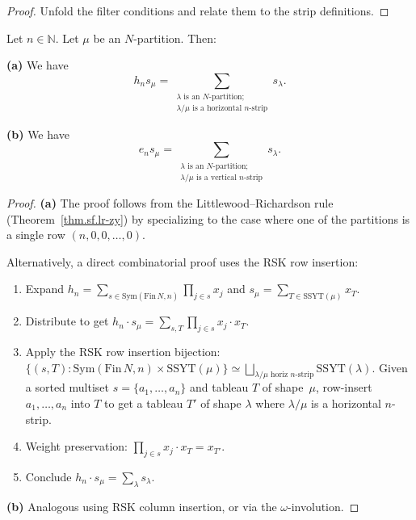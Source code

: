 \begin{proof}
\leanok
Unfold the filter conditions and relate them to the strip definitions.
\end{proof}

\begin{theorem}
\label{thm.sf.pieri}
\leantarget
Let $n\in\mathbb{N}$. Let $\mu$ be an
$N$-partition. Then:

\textbf{(a)} We have%
\[
h_{n}s_{\mu}=\sum_{\substack{\lambda\text{ is an }N\text{-partition;}%
\\\lambda/\mu\text{ is a horizontal }n\text{-strip}}}s_{\lambda}.
\]


\textbf{(b)} We have%
\[
e_{n}s_{\mu}=\sum_{\substack{\lambda\text{ is an }N\text{-partition;}%
\\\lambda/\mu\text{ is a vertical }n\text{-strip}}}s_{\lambda}.
\]
\end{theorem}

\begin{proof}
\textbf{(a)} The proof follows from the Littlewood--Richardson rule
(Theorem~\ref{thm.sf.lr-zy}) by
specializing to the case where one of the partitions is a single row
$(n, 0, 0, \ldots, 0)$.

Alternatively, a direct combinatorial proof uses the RSK row insertion:
\begin{enumerate}
\item Expand $h_n = \sum_{s \in \mathrm{Sym}(\mathrm{Fin}\,N, n)} \prod_{j \in s} x_j$
and $s_\mu = \sum_{T \in \mathrm{SSYT}(\mu)} x_T$.
\item Distribute to get $h_n \cdot s_\mu = \sum_{s, T} \prod_{j \in s} x_j \cdot x_T$.
\item Apply the RSK row insertion bijection:
$\{(s, T) : \mathrm{Sym}(\mathrm{Fin}\,N, n) \times \mathrm{SSYT}(\mu)\}
\simeq \bigsqcup_{\lambda/\mu \text{ horiz } n\text{-strip}} \mathrm{SSYT}(\lambda)$.
Given a sorted multiset $s = \{a_1, \ldots, a_n\}$ and tableau $T$ of shape~$\mu$,
row-insert $a_1, \ldots, a_n$ into $T$ to get a tableau $T'$ of shape $\lambda$
where $\lambda/\mu$ is a horizontal $n$-strip.
\item Weight preservation: $\prod_{j \in s} x_j \cdot x_T = x_{T'}$.
\item Conclude $h_n \cdot s_\mu = \sum_\lambda s_\lambda$.
\end{enumerate}

\textbf{(b)} Analogous using RSK column insertion, or via the $\omega$-involution.
\end{proof}


